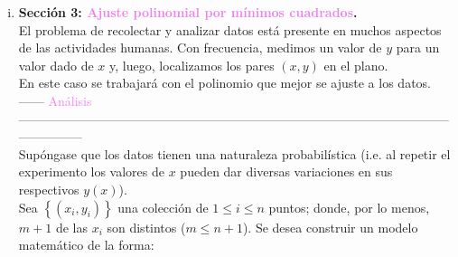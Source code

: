 \documentclass[11pt]{article}
\theoremstyle{definition}
\begin{document}
\begin{enumerate}[(i)]
\begin{equation*}
\begin{pmatrix}
75.0425
\end{pmatrix}
\end{equation*}
Donde se cumple $\vec{d} = \vec{b} - \textbf{A}\vec{x}$:
\begin{equation*}
\vec{d} =
\begin{pmatrix}
-1.12467\\
-0.015755\\
-0.10684\\
0.102075\\
0.41099\\
0.519905\\
0.42882\\
0.337735\\
0.04665\\
-0.23552\\
0.18231\\
-0.09986\\
0.01797\\
-0.4642
\end{pmatrix}
\end{equation*}
Donde $\|d\|^{2} = 2.34079$ es el error entregado, que es equivalente al SE. Adem\'as, se tiene que el RMSE es de $0.4089$. $\blacksquare$ \\
\vspace{2mm} %
	\item\textbf{Secci\'on 3: \textcolor{violet}{Ajuste polinomial por m\'inimos cuadrados}.}\\
El problema de recolectar y analizar datos est\'a presente en muchos aspectos de las actividades humanas. Con frecuencia, medimos un valor de $y$ para un valor dado de $x$ y, luego, localizamos los pares $(x, y)$ en el plano.\\
En este caso se trabajar\'a con el polinomio que mejor se ajuste a los datos.\\
\vspace{2mm} %
------ \textcolor{violet}{An\'alisis} ---------------------------------------------------------------------------------------------------------------------\\
\vspace{2mm} %
Sup\'ongase que los datos tienen una naturaleza probabil\'istica (i.e. al repetir el experimento los valores de $x$ pueden dar diversas variaciones en sus respectivos $y(x)$).\\
Sea $\left\lbrace (x_{i}, y_{i}) \right\rbrace$ una colecci\'on de $1 \leq i \leq n$ puntos; donde, por lo menos, $m + 1$ de las $x_{i}$ son distintos ($m \leq n + 1$). Se desea construir un modelo matem\'atico de la forma:

\end{enumerate}
\end{document}
